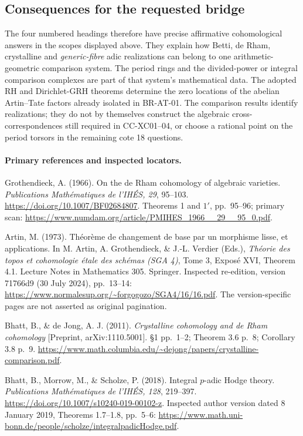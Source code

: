 \documentclass[11pt,a4paper]{article}
\theoremstyle{definition}\newtheorem{definition}[theorem]{Definition}
\theoremstyle{remark}\newtheorem{remark}[theorem]{Remark}
\begin{document}
\subsection{Consequences for the requested bridge}
The four numbered headings therefore have precise affirmative
cohomological answers in the scopes displayed above.  They explain
how Betti, de Rham, crystalline and \emph{generic-fibre} adic
realizations can belong to one arithmetic-geometric comparison
system.  The period rings and the divided-power or integral
comparison complexes are part of that system's mathematical data.
The adopted RH and Dirichlet-GRH theorems determine the zero locations
of the abelian Artin--Tate factors already isolated in BR-AT-01.
The comparison results identify realizations; they do not by
themselves construct the algebraic cross-correspondences still
required in CC-XC01--04, or choose a rational point on the period
torsors in the remaining cote 18 questions.

\paragraph{Primary references and inspected locators.}
Grothendieck, A. (1966). On the de Rham cohomology of algebraic
varieties. \emph{Publications Math\'ematiques de l'IH\'ES, 29},
95--103. \url{https://doi.org/10.1007/BF02684807}.
Theorems 1 and $1'$, pp.~95--96; primary scan:
\url{https://www.numdam.org/article/PMIHES_1966__29__95_0.pdf}.

Artin, M. (1973). Th\'eor\`eme de changement de base par un
morphisme lisse, et applications. In M. Artin, A. Grothendieck,
\& J.-L. Verdier (Eds.), \emph{Th\'eorie des topos et cohomologie
\'etale des sch\'emas (SGA 4)}, Tome 3, Expos\'e XVI,
Theorem 4.1. Lecture Notes in Mathematics 305. Springer.
Inspected re-edition, version 71766d9 (30 July 2024), pp.~13--14:
\url{https://www.normalesup.org/~forgogozo/SGA4/16/16.pdf}.
The version-specific pages are not asserted as original pagination.

Bhatt, B., \& de Jong, A. J. (2011).
\emph{Crystalline cohomology and de Rham cohomology}
[Preprint, arXiv:1110.5001]. \S1 pp.~1--2; Theorem 3.6 p.~8;
Corollary 3.8 p.~9.
\url{https://www.math.columbia.edu/~dejong/papers/crystalline-comparison.pdf}.

Bhatt, B., Morrow, M., \& Scholze, P. (2018).
Integral $p$-adic Hodge theory.
\emph{Publications Math\'ematiques de l'IH\'ES, 128}, 219--397.
\url{https://doi.org/10.1007/s10240-019-00102-z}.
Inspected author version dated 8 January 2019, Theorems 1.7--1.8,
pp.~5--6:
\url{https://www.math.uni-bonn.de/people/scholze/integralpadicHodge.pdf}.
\end{document}
